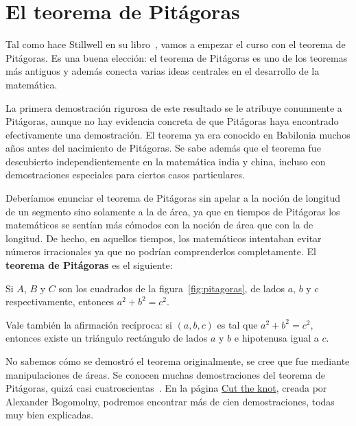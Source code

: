 \chapter{El teorema de Pitágoras}

Tal como hace Stillwell en su libro~\cite{MR2667826}, vamos a empezar el curso
con el teorema de Pitágoras. Es una buena elección: el teorema de Pitágoras es
uno de los teoremas más antiguos y además conecta varias ideas centrales en el
desarrollo de la matemática. 

La primera demostración rigurosa de este resultado se le atribuye conunmente a
Pitágoras, aunque no hay evidencia concreta de que Pitágoras haya encontrado
efectivamente una demostración.  El teorema ya era conocido en Babilonia muchos años 
antes del nacimiento de Pitágoras. Se sabe además que el teorema fue
descubierto independientemente en la matemática india y china, incluso
con demostraciones especiales para ciertos casos particulares. 

Deberíamos enunciar el teorema de Pitágoras sin apelar a la noción de longitud
de un segmento sino solamente a la de área, ya que en tiempos de Pitágoras los
matemáticos se sentían más cómodos con la noción de área que con la de
longitud.  De hecho, en aquellos tiempos, los matemáticos intentaban evitar
números irracionales ya que no podrían comprenderlos completamente. 
El \textbf{teorema de Pitágoras} es el siguiente:

\begin{theorem}[Pitágoras]
Si $A$, $B$ y $C$ son los cuadrados de la figura~\ref{fig:pitagoras}, de
lados $a$, $b$ y $c$ respectivamente, entonces
$a^2+b^2=c^2$.
\end{theorem}

Vale también la afirmación recíproca: si $(a,b,c)$ es tal que $a^2+b^2=c^2$,
entonces existe un triángulo rectángulo de lados $a$ y $b$ e hipotenusa igual a
$c$. 

No sabemos cómo se demostró el teorema originalmente, se cree que fue mediante
manipulaciones de áreas. Se conocen muchas demostraciones del teorema de
Pitágoras, quizá casi cuatroscientas~\cite{loomis1968pythagorean}. 
En la página
\href{http://cut-the-knot.org/}{Cut the knot}, creada por Alexander Bogomolny, podremos
encontrar más de cien demostraciones, todas muy bien explicadas.  

